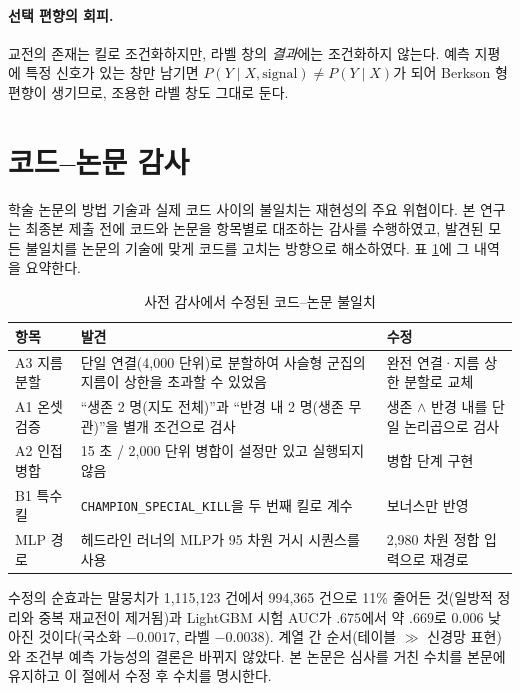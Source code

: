 \paragraph{선택 편향의 회피.} 교전의 존재는 킬로 조건화하지만, 라벨 창의 \emph{결과}에는 조건화하지 않는다. 예측 지평에 특정 신호가 있는 창만 남기면 $P(Y \mid X, \text{signal}) \ne P(Y \mid X)$가 되어 Berkson 형 편향이 생기므로, 조용한 라벨 창도 그대로 둔다.

\section{코드--논문 감사}
\label{sec:disc-audit}

학술 논문의 방법 기술과 실제 코드 사이의 불일치는 재현성의 주요 위협이다. 본 연구는 최종본 제출 전에 코드와 논문을 항목별로 대조하는 감사를 수행하였고, 발견된 모든 불일치를 논문의 기술에 맞게 코드를 고치는 방향으로 해소하였다. 표 \ref{tab:audit}에 그 내역을 요약한다.

\begin{table}[htbp]
  \centering
  \caption{사전 감사에서 수정된 코드--논문 불일치}
  \label{tab:audit}
  \small
  \begin{tabularx}{\linewidth}{@{}lXX@{}}
    \toprule
    항목 & 발견 & 수정 \\
    \midrule
    A3 지름 분할 & 단일 연결(4{,}000 단위)로 분할하여 사슬형 군집의 지름이 상한을 초과할 수 있었음 & 완전 연결·지름 상한 분할로 교체 \\
    A1 온셋 검증 & ``생존 2 명(지도 전체)''과 ``반경 내 2 명(생존 무관)''을 별개 조건으로 검사 & 생존 $\wedge$ 반경 내를 단일 논리곱으로 검사 \\
    A2 인접 병합 & 15 초 / 2{,}000 단위 병합이 설정만 있고 실행되지 않음 & 병합 단계 구현 \\
    B1 특수 킬 & \texttt{CHAMPION\_SPECIAL\_KILL}을 두 번째 킬로 계수 & 보너스만 반영 \\
    MLP 경로 & 헤드라인 러너의 MLP가 95 차원 거시 시퀀스를 사용 & 2{,}980 차원 정합 입력으로 재경로 \\
    \bottomrule
  \end{tabularx}
\end{table}

수정의 순효과는 말뭉치가 1{,}115{,}123 건에서 994{,}365 건으로 11\% 줄어든 것(일방적 정리와 중복 재교전이 제거됨)과 LightGBM 시험 AUC가 $.675$에서 약 $.669$로 $0.006$ 낮아진 것이다(국소화 $-0.0017$, 라벨 $-0.0038$). 계열 간 순서(테이블 $\gg$ 신경망 표현)와 조건부 예측 가능성의 결론은 바뀌지 않았다. 본 논문은 심사를 거친 수치를 본문에 유지하고 이 절에서 수정 후 수치를 명시한다. 

